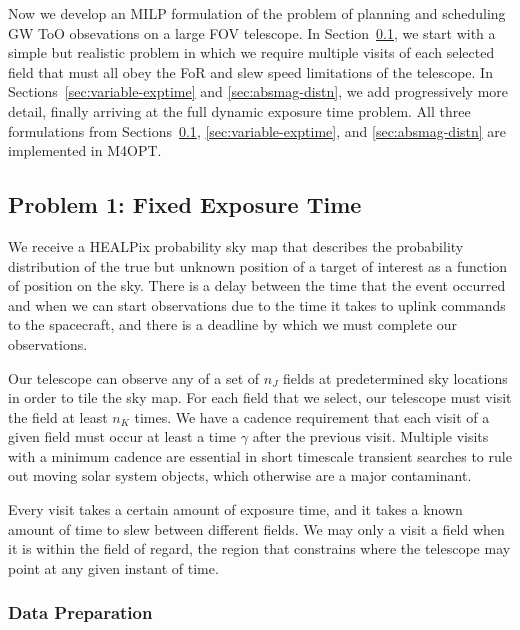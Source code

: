 \documentclass[twocolumn,times]{aastex631}
\begin{document}
Now we develop an \ac{MILP} formulation of the problem of planning and scheduling \ac{GW} \ac{ToO} obsevations on a large \ac{FOV} telescope. In Section~\ref{sec:fixed-exptime}, we start with a simple but realistic problem in which we require multiple visits of each selected field that must all obey the \ac{FoR} and slew speed limitations of the telescope. In Sections~\ref{sec:variable-exptime} and \ref{sec:absmag-distn}, we add progressively more detail, finally arriving at the full dynamic exposure time problem. All three formulations from Sections~\ref{sec:fixed-exptime}, \ref{sec:variable-exptime}, and \ref{sec:absmag-distn} are implemented in \ac{M4OPT}.

\subsection{Problem 1: Fixed Exposure Time}
\label{sec:fixed-exptime}

We receive a \ac{HEALPix} probability sky map that describes the probability distribution of the true but unknown position of a target of interest as a function of position on the sky. There is a delay between the time that the event occurred and when we can start observations due to the time it takes to uplink commands to the spacecraft, and there is a deadline by which we must complete our observations.

Our telescope can observe any of a set of $n_J$ fields at predetermined sky locations in order to tile the sky map. For each field that we select, our telescope must visit the field at least $n_K$ times. We have a cadence requirement that each visit of a given field must occur at least a time $\gamma$ after the previous visit. Multiple visits with a minimum cadence are essential in short timescale transient searches to rule out moving solar system objects, which otherwise are a major contaminant.

Every visit takes a certain amount of exposure time, and it takes a known amount of time to slew between different fields. We may only a visit a field when it is within the field of regard, the region that constrains where the telescope may point at any given instant of time.

\subsubsection{Data Preparation}
\end{document}
